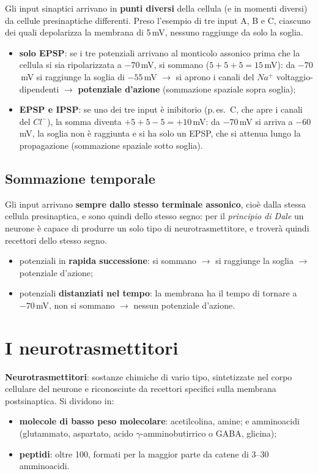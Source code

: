 Gli input sinaptici arrivano in \textbf{punti diversi} della cellula (e in momenti diversi) da
cellule presinaptiche differenti. Preso l'esempio di tre input A, B e C, ciascuno dei quali
depolarizza la membrana di 5\,mV, nessuno raggiunge da solo la soglia.
\begin{itemize}
  \item \textbf{solo EPSP}: se i tre potenziali arrivano al monticolo assonico prima che la cellula
    si sia ripolarizzata a $-70$\,mV, si sommano ($5 + 5 + 5 = 15$\,mV): da $-70$\,mV si raggiunge
    la soglia di $-55$\,mV $\rightarrow$ si aprono i canali del $Na^+$ voltaggio-dipendenti
    $\rightarrow$ \textbf{potenziale d'azione} (sommazione spaziale sopra soglia);
  \item \textbf{EPSP e IPSP}: se uno dei tre input è inibitorio (p.\,es.\ C, che apre i canali del
    $Cl^-$), la somma diventa $+5 +5 -5 = +10$\,mV: da $-70$\,mV si arriva a $-60$\,mV, la soglia
    non è raggiunta e si ha solo un EPSP, che si attenua lungo la propagazione (sommazione spaziale
    sotto soglia).
\end{itemize}

\subsection{Sommazione temporale}

Gli input arrivano \textbf{sempre dallo stesso terminale assonico}, cioè dalla stessa cellula
presinaptica, e sono quindi dello stesso segno: per il \textit{principio di Dale} un neurone è
capace di produrre un solo tipo di neurotrasmettitore, e troverà quindi recettori dello stesso
segno.
\begin{itemize}
  \item potenziali in \textbf{rapida successione}: si sommano $\rightarrow$ si raggiunge la soglia
    $\rightarrow$ potenziale d'azione;
  \item potenziali \textbf{distanziati nel tempo}: la membrana ha il tempo di tornare a $-70$\,mV,
    non si sommano $\rightarrow$ nessun potenziale d'azione.
\end{itemize}

\section{I neurotrasmettitori}

\textbf{Neurotrasmettitori}: sostanze chimiche di vario tipo, sintetizzate nel corpo cellulare del
neurone e riconosciute da recettori specifici sulla membrana postsinaptica. Si dividono in:
\begin{itemize}
  \item \textbf{molecole di basso peso molecolare}: acetilcolina, amine; e amminoacidi
    (glutammato, aspartato, acido $\gamma$-amminobutirrico o GABA, glicina);
  \item \textbf{peptidi}: oltre 100, formati per la maggior parte da catene di 3--30 amminoacidi.
\end{itemize}

